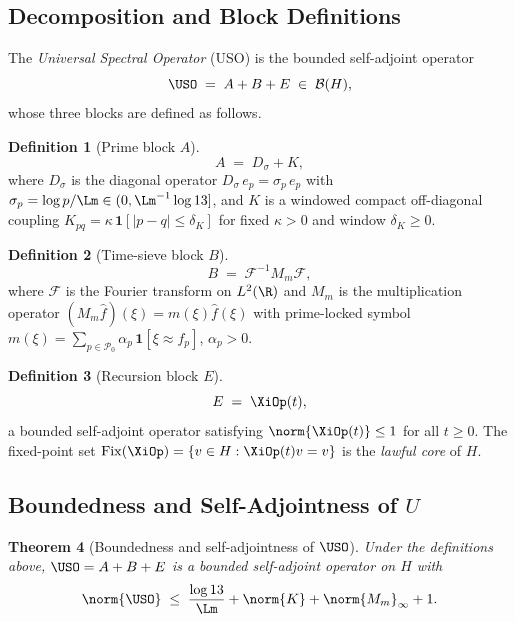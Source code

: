 \documentclass[12pt,a4paper]{article}
\theoremstyle{plain}
\newtheorem{theorem}{Theorem}[section]
\theoremstyle{definition}
\newtheorem{definition}[theorem]{Definition}
\begin{document}
\subsection{Decomposition and Block Definitions}

The \emph{Universal Spectral Operator} (USO) is the bounded self-adjoint
operator
\begin{equation}
  \USO \;=\; A + B + E \;\in\;\mathcal{B}(H),
  \label{eq:uso}
\end{equation}
whose three blocks are defined as follows.

\begin{definition}[Prime block $A$]
  \label{def:A}
  \[
    A \;=\; D_\sigma + K,
  \]
  where $D_\sigma$ is the diagonal operator
  $D_\sigma\, e_p = \sigma_p\, e_p$ with
  $\sigma_p = \log p / \Lm \in (0,\Lm^{-1}\log 13]$,
  and $K$ is a windowed compact off-diagonal coupling
  $K_{pq} = \kappa\,\mathbf{1}[|p-q|\le\delta_K]$
  for fixed $\kappa>0$ and window $\delta_K\ge0$.
\end{definition}

\begin{definition}[Time-sieve block $B$]
  \label{def:B}
  \[
    B \;=\; \mathcal{F}^{-1}M_m\mathcal{F},
  \]
  where $\mathcal{F}$ is the Fourier transform on $L^2(\R)$ and $M_m$ is
  the multiplication operator $(M_m \hat f)(\xi) = m(\xi)\hat f(\xi)$
  with prime-locked symbol
  $m(\xi) = \sum_{p\in\mathcal{P}_0} \alpha_p\,
  \mathbf{1}[\xi \approx f_p]$, $\alpha_p>0$.
\end{definition}

\begin{definition}[Recursion block $E$]
  \label{def:E}
  \[
    E \;=\; \XiOp(t),
  \]
  a bounded self-adjoint operator satisfying $\norm{\XiOp(t)}\le 1$ for all
  $t\ge0$.  The fixed-point set
  $\mathrm{Fix}(\XiOp) = \{v\in H : \XiOp(t)v = v\}$
  is the \emph{lawful core} of $H$.
\end{definition}

\subsection{Boundedness and Self-Adjointness of $U$}

\begin{theorem}[Boundedness and self-adjointness of $\USO$]
  \label{thm:uso-bounded}
  Under the definitions above, $\USO = A+B+E$ is a bounded self-adjoint
  operator on $H$ with
  \[
    \norm{\USO} \;\le\;
    \frac{\log 13}{\Lm} + \norm{K} + \norm{M_m}_\infty + 1.
  \]
\end{theorem}
\end{document}

